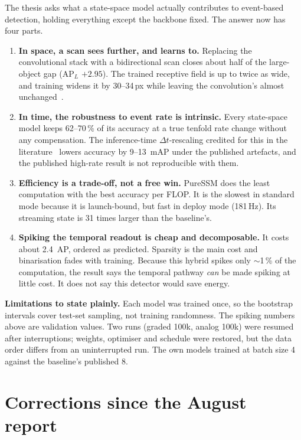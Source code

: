 \documentclass[10pt,a4paper]{article}
\begin{document}
The thesis asks what a state-space model actually contributes to event-based detection, holding everything
except the backbone fixed. The answer now has four parts.

\begin{enumerate}[leftmargin=1.5em]
  \item \textbf{In space, a scan sees further, and learns to.} Replacing the convolutional stack with a
  bidirectional scan closes about half of the large-object gap ($\mathrm{AP}_L$ $+2.95$). The trained
  receptive field is up to twice as wide, and training widens it by 30--34\,px while leaving the
  convolution's almost unchanged~\cite{luo2016understanding}.
  \item \textbf{In time, the robustness to event rate is intrinsic.} Every state-space model keeps 62--70\,\%
  of its accuracy at a true tenfold rate change without any compensation. The inference-time
  $\Delta t$-rescaling credited for this in the literature~\cite{zubic2024state} lowers accuracy by 9--13~mAP
  under the published artefacts, and the published high-rate result is not reproducible with them.
  \item \textbf{Efficiency is a trade-off, not a free win.} PureSSM does the least computation with the best
  accuracy per FLOP. It is the slowest in standard mode because it is launch-bound, but fast in deploy mode
  (181\,Hz). Its streaming state is 31 times larger than the baseline's.
  \item \textbf{Spiking the temporal readout is cheap and decomposable.} It costs about 2.4~AP, ordered as
  predicted. Sparsity is the main cost and binarisation fades with training. Because this hybrid spikes only
  $\sim$1\,\% of the computation, the result says the temporal pathway \emph{can} be made spiking at little
  cost. It does not say this detector would save energy.
\end{enumerate}

\textbf{Limitations to state plainly.} Each model was trained once, so the bootstrap intervals cover test-set
sampling, not training randomness. The spiking numbers above are validation values. Two runs (graded 100k,
analog 100k) were resumed after interruptions; weights, optimiser and schedule were restored, but the data
order differs from an uninterrupted run. The own models trained at batch size 4 against the baseline's
published 8.

\section{Corrections since the August report}
\label{sec:corrections}
\end{document}
